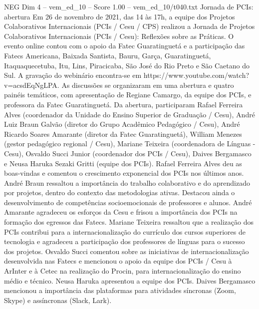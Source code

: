 \begin{textsample}{NEG Dim 4 – vem\_ed\_10 – Score 1.00 – vem\_ed\_10/t040.txt}  \label{ex:f4_neg_033}
Jornada de PCIs: abertura Em 26 de novembro de 2021, das 14 às 17h, a equipe dos Projetos Colaborativos Internacionais (PCIs / Cesu / CPS) realizou a Jornada de Projetos Colaborativos Internacionais (PCIs / Cesu): Reflexões sobre as Práticas.
O evento online contou com o apoio da Fatec Guaratinguetá e a participação das Fatecs Americana, Baixada Santista, Bauru, Garça, Guaratinguetá, Itaquaquecetuba, Itu, Lins, Piracicaba, São José do Rio Preto e São Caetano do Sul.
A gravação do webinário encontra-se em https://www.youtube.com/watch?v=acsdEqNgLPA.
As discussões se organizaram em uma abertura e quatro painéis temáticos, com apresentação de Regiane Camargo, da equipe dos PCIs, e professora da Fatec Guaratinguetá.
Da abertura, participaram Rafael Ferreira Alves (coordenador da Unidade do Ensino Superior de Graduação / Cesu), André Luiz Braun Galvão (diretor do Grupo Acadêmico Pedagógico / Cesu), André Ricardo Soares Amarante (diretor da Fatec Guaratinguetá), William Menezes (gestor pedagógico regional / Cesu), Mariane Teixeira (coordenadora de Línguas - Cesu), Osvaldo Succi Junior (coordenador dos PCIs / Cesu), Daives Bergamasco e Neusa Haruka Sezaki Gritti (equipe dos PCIs).
Rafael Ferreira Alves deu as boas-vindas e comentou o crescimento exponencial dos PCIs nos últimos anos.
André Braun ressaltou a importância do trabalho colaborativo e do aprendizado por projetos, dentro do contexto das metodologias ativas.
Destacou ainda o desenvolvimento de competências socioemocionais de professores e alunos.
André Amarante agradeceu os esforços da Cesu e frisou a importância dos PCIs na formação dos egressos das Fatecs.
Mariane Teixeira ressaltou que a realização dos PCIs contribui para a internacionalização do currículo dos cursos superiores de tecnologia e agradeceu a participação dos professores de línguas para o sucesso dos projetos.
Osvaldo Succi comentou sobre as iniciativas de internacionalização desenvolvida nas Fatecs e mencionou o apoio da equipe dos PCIs / Cesu à ArInter e à Cetec na realização do Procin, para internacionalização do ensino médio e técnico.
Neusa Haruka apresentou a equipe dos PCIs.
Daives Bergamasco mencionou a importância das plataformas para atividades síncronas (Zoom, Skype) e assíncronas (Slack, Lark).

\end{textsample}

